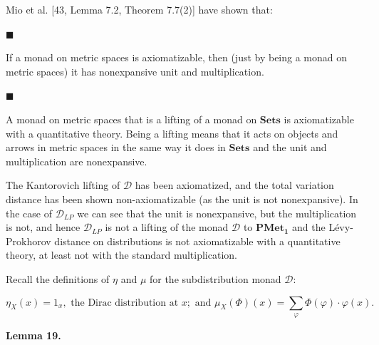  
 
Mio et al. [43, Lemma 7.2, Theorem 7.7(2)] have shown that:\par
  
\par\noindent  $\blacksquare$ 
 
If a monad on metric spaces is axiomatizable, then (just by being a monad on metric spaces) it has nonexpansive unit and multiplication.\par
 
 
 
\par\noindent  $\blacksquare$ 
 
A monad on metric spaces that is a lifting of a monad on $\mathbf{Sets}$ is axiomatizable with a quantitative theory. Being a lifting means that it acts on objects and arrows in metric spaces in the same way it does in $\mathbf{Sets}$ and the unit and multiplication are nonexpansive.\par
 
 
  
The Kantorovich lifting of $\mathcal{D}$ has been axiomatized, and the total variation distance has been shown non-axiomatizable (as the unit is not nonexpansive). In the case of $\mathcal{D}_{LP}$ we can see that the unit is nonexpansive, but the multiplication is not, and hence $\mathcal{D}_{LP}$ is not a lifting of the monad $\mathcal{D}$ to $\mathbf{PMet_{1}}$ and the Lévy-Prokhorov distance on distributions is not axiomatizable with a quantitative theory, at least not with the standard multiplication.\par
 
 
 
Recall the definitions of $\eta$ and $\mu$ for the subdistribution monad $\mathcal{D}$:\par
  
\par  \quad  \[\eta_{X}(x)=1_{x},\text{ the Dirac distribution at }x;\text{ and }\mu_{X}(\Phi)(x)=\sum_{\varphi}\Phi(\varphi)\cdot\varphi(x).\]\quad  \quad  
  
 
 
\par\medskip\noindent\textbf{Lemma 19.}\par
 
